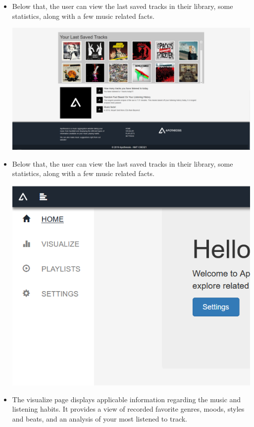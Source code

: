 \documentclass[letter, 11pt]{article}
\begin{document}
\begin{itemize}
    \item Below that, the user can view the last saved tracks in their library, some statistics, along with a few music related facts.
    
    \includegraphics[scale=0.33,left]{snapshot/Capture2.PNG}
    
    \item Below that, the user can view the last saved tracks in their library, some statistics, along with a few music related facts.
    
    \includegraphics[scale=0.33,left]{snapshot/Capture3.PNG}
    
    \item The visualize page displays applicable information regarding the music and listening habits. It provides a view of recorded favorite genres, moods, styles and beats, and an analysis of your most listened to track.
    

\end{itemize}
\end{document}
